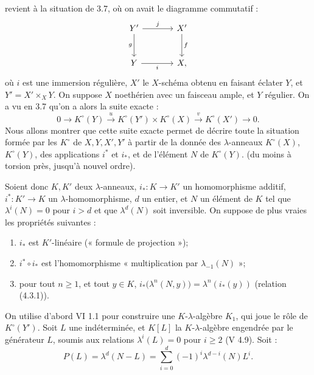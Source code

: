 revient à la situation de 3.7, où on avait le diagramme commutatif :
\[
\begin{tikzcd}[column sep=large,row sep=large]
Y' \arrow[r,"j"] \arrow[d,"g"'] & X' \arrow[d,"f"]\\
Y \arrow[r,"i"'] & X,
\end{tikzcd}
\]
où \(i\) est une immersion régulière, \(X'\) le \(X\)-schéma obtenu en faisant éclater \(Y\), et \(Y'=X'\times_XY\). On suppose \(X\) noethérien avec un faisceau ample, et \(Y\) régulier. On a vu en 3.7 qu'on a alors la suite exacte :
\[
0\longrightarrow K^\circ(Y)\xrightarrow{u}
K^\circ(Y')\times K^\circ(X)\xrightarrow{v}
K^\circ(X')\longrightarrow0.
\]
Nous allons montrer que cette suite exacte permet de décrire toute la situation formée par les \(K^\circ\) de \(X,Y,X',Y'\) à partir de la donnée des \(\lambda\)-anneaux \(K^\circ(X)\), \(K^\circ(Y)\), des applications \(i^*\) et \(i_*\), et de l'élément \(N\) de \(K^\circ(Y)\). (du moins à torsion près, jusqu'à nouvel ordre).

Soient donc \(K,K'\) deux \(\lambda\)-anneaux, \(i_*:K\to K'\) un homomorphisme additif, \(i^*:K'\to K\) un \(\lambda\)-homomorphisme, \(d\) un entier, et \(N\) un élément de \(K\) tel que \(\lambda^i(N)=0\) pour \(i>d\) et que \(\lambda^d(N)\) soit inversible. On suppose de plus vraies les propriétés suivantes :
\begin{enumerate}[label=\roman*)]
\item \(i_*\) est \(K'\)-linéaire (« formule de projection »);
\item \(i^*\circ i_*\) est l'homomorphisme « multiplication par \(\lambda_{-1}(N)\) »;
\item pour tout \(n\ge1\), et tout \(y\in K\), \(i_*\bigl(\lambda^n(N,y)\bigr)=\lambda^n(i_*(y))\) (relation (4.3.1)).
\end{enumerate}

On utilise d'abord VI 1.1 pour construire une \(K\)-\(\lambda\)-algèbre \(K_1\), qui joue le rôle de \(K^\circ(Y')\). Soit \(L\) une indéterminée, et \(K[L]\) la \(K\)-\(\lambda\)-algèbre engendrée par le générateur \(L\), soumis aux relations \(\lambda^i(L)=0\) pour \(i\ge2\) (V 4.9). Soit :
\[
  P(L)=\lambda^d(N-L)=\sum_{i=0}^{d}(-1)^i\lambda^{d-i}(N)L^i.
\]
